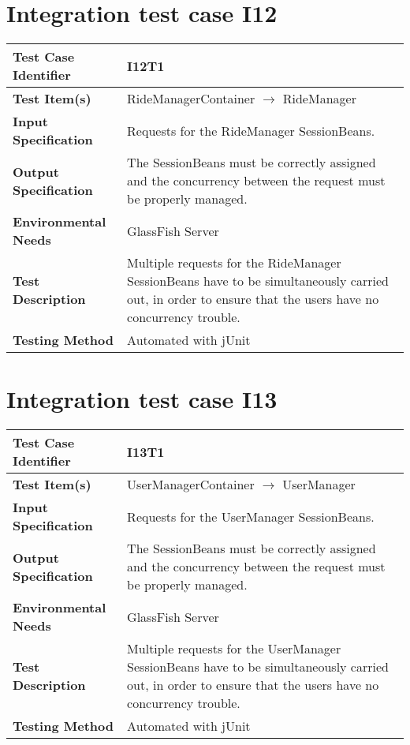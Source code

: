 \vspace{2em}

\section{Integration test case I12}

\begin{tabular}{l p{}}
    \hline
    \textbf{Test Case Identifier} & I12T1\\
    \hline
    \textbf{Test Item(s)} & RideManagerContainer $\rightarrow$ RideManager \\
    \hline
    \textbf{Input Specification} & Requests for the RideManager SessionBeans.\\
    \hline
    \textbf{Output Specification} & The SessionBeans must be correctly assigned and  the concurrency between the request must be properly managed.\\
    \hline
    \textbf{Environmental Needs} & GlassFish Server\\
    \hline
    \textbf{Test Description} & Multiple requests for the RideManager SessionBeans have to be simultaneously carried out, in order to ensure that the users have no concurrency trouble.\\
    \hline
    \textbf{Testing Method} & Automated with jUnit \\
    \hline
\end{tabular}

\vspace{2em}

\section{Integration test case I13}

\begin{tabular}{l p{}}
    \hline
    \textbf{Test Case Identifier} & I13T1\\
    \hline
    \textbf{Test Item(s)} & UserManagerContainer $\rightarrow$ UserManager \\
    \hline
    \textbf{Input Specification} & Requests for the UserManager SessionBeans.\\
    \hline
    \textbf{Output Specification} & The SessionBeans must be correctly assigned and  the concurrency between the request must be properly managed.\\
    \hline
    \textbf{Environmental Needs} & GlassFish Server\\
    \hline
    \textbf{Test Description} & Multiple requests for the UserManager SessionBeans have to be simultaneously carried out, in order to ensure that the users have no concurrency trouble.\\
    \hline
    \textbf{Testing Method} & Automated with jUnit \\
    \hline
\end{tabular}

